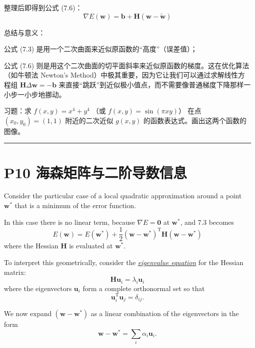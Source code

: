 \documentclass{article}
\begin{document}
{整理后即得到公式 (7.6)：
$$\nabla E(\mathbf{w}) = \mathbf{b} + \mathbf{H}(\mathbf{w} - \tilde{\mathbf{w}})$$

总结与意义：

公式 (7.3) 是用一个二次曲面来近似原函数的“高度”（误差值）；

公式 (7.6) 则是用这个二次曲面的切平面斜率来近似原函数的梯度。这在优化算法（如牛顿法 Newton's Method）中极其重要，因为它让我们可以通过求解线性方程组 $\mathbf{H}\Delta\mathbf{w} = -\mathbf{b}$ 来直接“跳跃”到近似极小值点，而不需要像普通梯度下降那样一小步一小步地挪动。

习题：求 $f(x,y)=x^4+y^4$ （或 $f(x,y)=\sin(\pi xy)$） 在点 $(x_0,y_0)=(1,1)$ 附近的二次近似 $g(x,y)$ 的函数表达式。画出这两个函数的图像。
}

\noindent\rule{\linewidth}{0.4pt}
 
\section{P10 海森矩阵与二阶导数信息}

Consider the particular case of a local quadratic approximation around a point $\mathbf{w}^*$ that is a minimum of the error function. 

In this case there is no linear term, because $\nabla E = \mathbf{0}$ at $\mathbf{w}^*$, and {7.3} becomes
\begin{equation}
E(\mathbf{w}) = E(\mathbf{w}^*) + \frac{1}{2} (\mathbf{w} - \mathbf{w}^*)^\mathrm{T} \mathbf{H} (\mathbf{w} - \mathbf{w}^*)
\tag{7.7}
\end{equation}
where the Hessian $\mathbf{H}$ is evaluated at $\mathbf{w}^*$. 

To interpret this geometrically, consider the \underline{\emph{eigenvalue equation}} for the Hessian matrix:
\begin{equation}
\mathbf{H} \mathbf{u}_i = \lambda_i \mathbf{u}_i
\tag{7.8}
\end{equation}
where the eigenvectors $\mathbf{u}_i$ form a complete orthonormal set so that
\begin{equation}
\mathbf{u}_i^\mathrm{T} \mathbf{u}_j = \delta_{ij}.
\tag{7.9}
\end{equation}

We now expand $(\mathbf{w} - \mathbf{w}^*)$ as a linear combination of the eigenvectors in the form
\begin{equation}
\mathbf{w} - \mathbf{w}^* = \sum_i \alpha_i \mathbf{u}_i.
\tag{7.10}
\end{equation}
\end{document}
